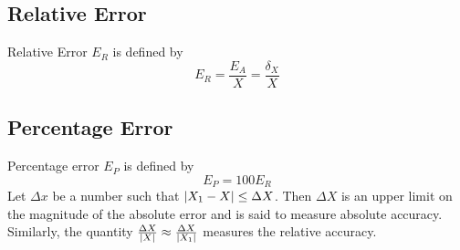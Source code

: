 \documentclass[12pt,class=book,crop=false]{standalone}
\begin{document}
\subsection{Relative Error}
Relative Error \( E_R \) is defined by
\[
    E_R=\frac{E_A}{X}=\frac{\delta_X}{X}
\]
\subsection{Percentage Error}
Percentage error \( E_P \) is defined by
\[
    E_P=100 E_R
\]
Let \( \Delta x \) be a number such that \( \left\vert X_1-X\right\vert\leq \Delta X \). Then \( \Delta X \) is an upper limit on the magnitude of the absolute error and is said to measure absolute accuracy. Similarly, the quantity \( \frac{\Delta X}{\left\vert X\right\vert}\approx\frac{\Delta X}{\left\vert X_1\right\vert} \) measures the relative accuracy.
\end{document}
